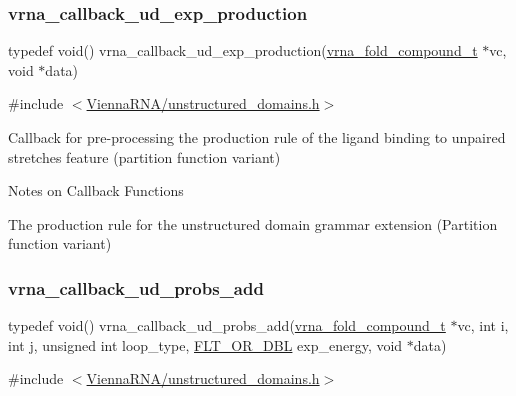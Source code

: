 \subsubsection{\texorpdfstring{vrna\_callback\_ud\_exp\_production}{vrna\_callback\_ud\_exp\_production}}
{\footnotesize\ttfamily typedef void() vrna\+\_\+callback\+\_\+ud\+\_\+exp\+\_\+production(\mbox{\hyperlink{group__fold__compound_ga1b0cef17fd40466cef5968eaeeff6166}{vrna\+\_\+fold\+\_\+compound\+\_\+t}} $\ast$vc, void $\ast$data)}



{\ttfamily \#include $<$\mbox{\hyperlink{unstructured__domains_8h}{Vienna\+R\+N\+A/unstructured\+\_\+domains.\+h}}$>$}



Callback for pre-\/processing the production rule of the ligand binding to unpaired stretches feature (partition function variant) 

\begin{DoxyRefDesc}{Notes on Callback Functions}
\item[\mbox{\hyperlink{callbacks__callbacks000010}{Notes on Callback Functions}}]The production rule for the unstructured domain grammar extension (Partition function variant) \end{DoxyRefDesc}
\mbox{\label{group__domains__up_gab10498abc84fcaf336aca8f8d7d42eb2}} 
\subsubsection{\texorpdfstring{vrna\_callback\_ud\_probs\_add}{vrna\_callback\_ud\_probs\_add}}
{\footnotesize\ttfamily typedef void() vrna\+\_\+callback\+\_\+ud\+\_\+probs\+\_\+add(\mbox{\hyperlink{group__fold__compound_ga1b0cef17fd40466cef5968eaeeff6166}{vrna\+\_\+fold\+\_\+compound\+\_\+t}} $\ast$vc, int i, int j, unsigned int loop\+\_\+type, \mbox{\hyperlink{group__data__structures_ga31125aeace516926bf7f251f759b6126}{F\+L\+T\+\_\+\+O\+R\+\_\+\+D\+BL}} exp\+\_\+energy, void $\ast$data)}



{\ttfamily \#include $<$\mbox{\hyperlink{unstructured__domains_8h}{Vienna\+R\+N\+A/unstructured\+\_\+domains.\+h}}$>$}



